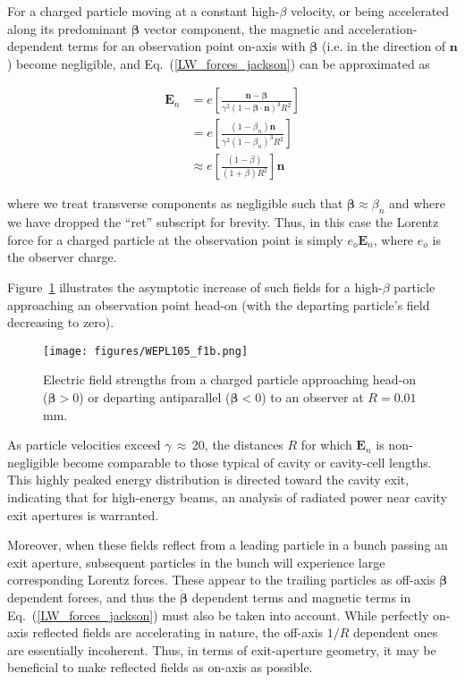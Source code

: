 \documentclass[reprint,
               amsmath,amssymb,nofootinbib, aps%
              ]{revtex4-2}
\begin{document}
For a charged particle moving at a constant high-$\beta$ velocity, or being accelerated along its predominant $\boldsymbol{\beta}$ vector component, the magnetic and acceleration-dependent terms for an observation point on-axis with $\boldsymbol{\beta}$ (i.e. in the direction of $\mathbf{n}$) become negligible, and Eq.~(\ref{LW_forces_jackson}) can be approximated as

\begin{align}
\label{eq:E_n_headon}
\mathbf{E}_n&=e\left[\frac{\mathbf{n}-\boldsymbol{\beta}}{\gamma^{2}(1-\boldsymbol{\beta} \cdot \mathbf{n})^{3} R^{2}}\right]
\nonumber \\
&=e\left[\frac{(1-\beta_n)\mathbf{n}}{\gamma^{2}(1-\beta_n)^{3} R^{2}}\right]
\nonumber \\
&\approx e\left[\frac{(1-\beta)}{(1+\beta) R^{2}}\right]\mathbf{n}
\end{align}

\noindent where we treat transverse components as negligible such that $\boldsymbol{\beta}\approx\beta_n$ and where we have dropped the ``ret'' subscript for brevity. Thus, in this case the Lorentz force for a charged particle at the observation point is simply $e_o\mathbf{E}_n$, where $e_o$ is the observer charge.

Figure~\ref{fig:rel_lortz_force_both} illustrates the asymptotic increase of such fields for a high-$\beta$ particle approaching an observation point head-on (with the departing particle's field decreasing to zero).

\begin{figure}
    \texttt{[image: figures/WEPL105\_f1b.png]}
    \label{fig:rel_lor_force_1d}
  \caption{Electric field strengths from a charged particle approaching head-on ($\boldsymbol{\beta}>0$) or departing antiparallel ($\boldsymbol{\beta}<0$) to an observer at $R=0.01$\,mm.}
  \label{fig:rel_lortz_force_both}
\end{figure}

As particle velocities exceed $\gamma\,{\approx}${\,}20, the distances $R$ for which $\mathbf{E}_n$ is non-negligible become comparable to those typical of cavity or cavity-cell lengths. This highly peaked energy distribution is directed toward the cavity exit, indicating that for high-energy beams, an analysis of radiated power near cavity exit apertures is warranted.

Moreover, when these fields reflect from a leading particle in a bunch passing an exit aperture, subsequent particles in the bunch will experience large corresponding Lorentz forces. These appear to the trailing particles as off-axis $\boldsymbol{\beta}$ dependent forces, and thus the $\boldsymbol{\dot{\beta}}$ dependent terms and magnetic terms in Eq.~(\ref{LW_forces_jackson}) must also be taken into account. While perfectly on-axis reflected fields are accelerating in nature, the off-axis $1/R$ dependent ones are essentially incoherent. Thus, in terms of exit-aperture geometry, it may be beneficial to make reflected fields as on-axis as possible.
\end{document}
